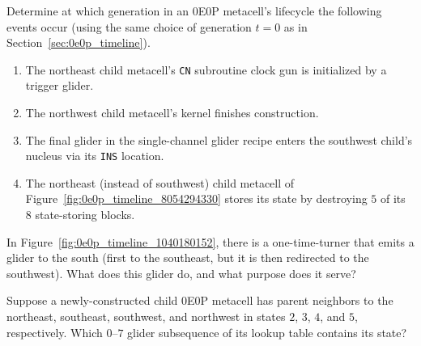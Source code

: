 \begin{multicols}{2}
	\mfilbreak
	
	
	\begin{problem}\label{exer:0e0p_clock_gun_find_timestamps} 
		Determine at which generation in an 0E0P metacell's lifecycle the following events occur (using the same choice of generation $t = 0$ as in Section~\ref{sec:0e0p_timeline}).\smallskip
		
		\begin{enumerate}[label=\bf\color{ocre}(\alph*)]
			\item The northeast child metacell's \texttt{CN} subroutine clock gun is initialized by a trigger glider.
			
			\item The northwest child metacell's kernel finishes construction.
			
			\item The final glider in the single-channel glider recipe enters the southwest child's nucleus via its \texttt{INS} location.
			
			\item The northeast (instead of southwest) child metacell of Figure~\ref{fig:0e0p_timeline_8054294330} stores its state by destroying $5$ of its $8$ state-storing blocks.
		\end{enumerate}
	\end{problem}


	\mfilbreak
	
	
	\begin{problemstar}\label{exer:0e0p_extra_south_glider} 
		In Figure~\ref{fig:0e0p_timeline_1040180152}, there is a one-time-turner that emits a glider to the south (first to the southeast, but it is then redirected to the southwest). What does this glider do, and what purpose does it serve?
	\end{problemstar}


	\mfilbreak


	\begin{problemstar}\label{exer:0e0p_which_lookup_subsequence} 
		Suppose a newly-constructed child 0E0P metacell has parent neighbors to the northeast, southeast, southwest, and northwest in states $2$, $3$, $4$, and $5$, respectively. Which $0$--$7$ glider subsequence of its lookup table contains its state?
	\end{problemstar}



\end{multicols}
